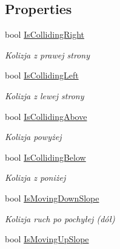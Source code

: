 \subsection*{Properties}
\begin{DoxyCompactItemize}
\item 
bool \hyperlink{class_controller_state2_d_ab415da9f261852bca7ba1ec57adf41bb}{Is\+Colliding\+Right}
\begin{DoxyCompactList}\small\item\em Kolizja z prawej strony \end{DoxyCompactList}\item 
bool \hyperlink{class_controller_state2_d_a4774afc53858b57f6016e1fb620268c4}{Is\+Colliding\+Left}
\begin{DoxyCompactList}\small\item\em Kolizja z lewej strony \end{DoxyCompactList}\item 
bool \hyperlink{class_controller_state2_d_a31e26c803a9fa52216eccaf2adb94b67}{Is\+Colliding\+Above}
\begin{DoxyCompactList}\small\item\em Kolizja powyżej \end{DoxyCompactList}\item 
bool \hyperlink{class_controller_state2_d_ac23ed207ad3b8225b8cdea0505165c8a}{Is\+Colliding\+Below}
\begin{DoxyCompactList}\small\item\em Kolizja z poniżej \end{DoxyCompactList}\item 
bool \hyperlink{class_controller_state2_d_a813f7c0a080a2b3f784751bb4fa63057}{Is\+Moving\+Down\+Slope}
\begin{DoxyCompactList}\small\item\em Kolizja ruch po pochyłej (dół) \end{DoxyCompactList}\item 
bool \hyperlink{class_controller_state2_d_ace3f85ee5879533e319143ee09b16f91}{Is\+Moving\+Up\+Slope}

\end{DoxyCompactItemize}
